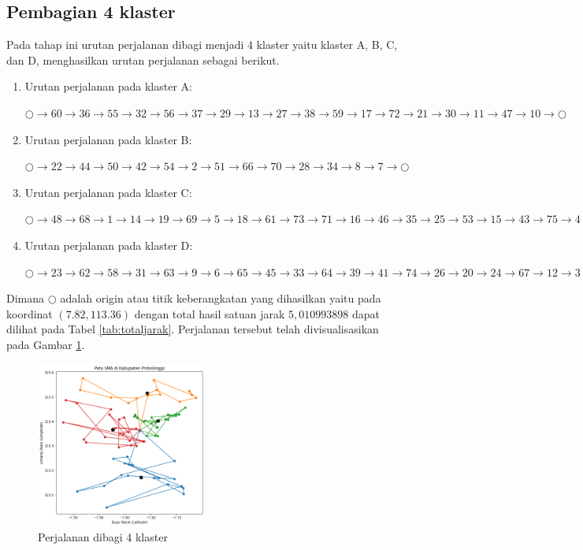 \subsection{Pembagian 4 klaster}

Pada tahap ini urutan perjalanan dibagi menjadi 4 klaster yaitu klaster A, B, C, dan D, menghasilkan urutan perjalanan sebagai berikut.

\begin{enumerate}

\item Urutan perjalanan pada klaster A:

$\bigcirc \to 60 \to 36 \to 55 \to 32 \to 56 \to 37 \to 29 \to 13 \to 27 \to 38 \to 59 \to 17 \to 72 \to 21 \to 30 \to 11 \to 47 \to 10 \to \bigcirc$

\item Urutan perjalanan pada klaster B:

$\bigcirc \to 22 \to 44 \to 50 \to 42 \to 54 \to 2 \to 51 \to 66 \to 70 \to 28 \to 34 \to 8 \to 7 \to \bigcirc$

\item Urutan perjalanan pada klaster C:

$\bigcirc \to 48 \to 68 \to 1 \to 14 \to 19 \to 69 \to 5 \to 18 \to 61 \to 73 \to 71 \to 16 \to 46 \to 35 \to 25 \to 53 \to 15 \to 43 \to 75 \to 4 \to 49 \to 40 \to 57 \to \bigcirc$

\item Urutan perjalanan pada klaster D:

$\bigcirc \to 23 \to 62 \to 58 \to 31 \to 63 \to 9 \to 6 \to 65 \to 45 \to 33 \to 64 \to 39 \to 41 \to 74 \to 26 \to 20 \to 24 \to 67 \to 12 \to 3 \to 52 \to \bigcirc$

\end{enumerate}

Dimana $\bigcirc$ adalah origin atau titik keberangkatan yang dihasilkan yaitu pada koordinat $(7.82, 113.36)$ dengan total hasil satuan jarak $5,010993898$ dapat dilihat pada Tabel \ref{tab:totaljarak}. Perjalanan tersebut telah divisualisasikan pada Gambar \ref{fig:hasil_mtsp4}.

\begin{figure}[H]
\centering
\includegraphics[width=0.5\textwidth]{Gambar/hasil_mtsp/4}
\caption{Perjalanan dibagi 4 klaster}
\label{fig:hasil_mtsp4}
\end{figure}

